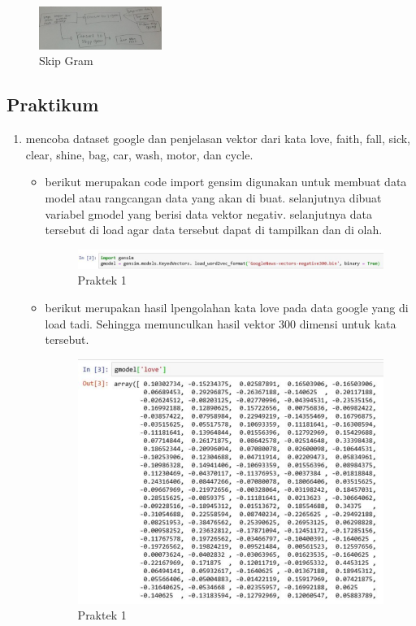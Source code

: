 \begin{enumerate}
	\begin{figure}[H]
		\includegraphics[width=4cm]{figures/1174008/5/skipgram.PNG}
            	\centering
           	 \caption{Skip Gram}
       	 \end{figure}

\end{enumerate}
\subsection{Praktikum}
\begin{enumerate}
\item mencoba dataset google dan penjelasan vektor dari kata love, faith, fall, sick, clear, shine, bag, car, wash, motor, dan cycle.\par

\begin{itemize}
\item berikut merupakan code import gensim digunakan untuk membuat data model atau rangcangan data yang akan di buat. selanjutnya dibuat variabel gmodel yang berisi data vektor negativ. selanjutnya data tersebut di load agar data tersebut dapat di tampilkan dan di olah.

\begin{figure}[ht]
\centering
\includegraphics[scale=0.5]{figures/1174008/5/2,1.PNG}
\caption{Praktek 1}
\end{figure}

\item berikut merupakan hasil lpengolahan kata love pada data google yang di load tadi. Sehingga memunculkan hasil vektor 300 dimensi untuk kata tersebut.
\begin{figure}[ht]
\centering
\includegraphics[scale=0.6]{figures/1174008/5/2,1,1.PNG}
\caption{Praktek 1}
\end{figure}


\end{itemize}
\end{enumerate}

